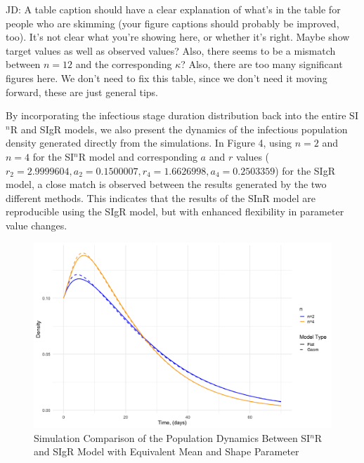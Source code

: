 \documentclass[12pt]{article}
\begin{document}
JD: A table caption should have a clear explanation of what's in the table for people who are skimming (your figure captions should probably be improved, too). It's not clear what you're showing here, or whether it's right. Maybe show target values as well as observed values? Also, there seems to be a mismatch between $n=12$ and the corresponding $\kappa$? Also, there are too many significant figures here. We don't need to fix this table, since we don't need it moving forward, these are just general tips.

By incorporating the infectious stage duration distribution back into the entire SI$^n$R and SIgR models, we also present the dynamics of the infectious population density generated directly from the simulations. In Figure 4, using $n=2$ and $n=4$ for the SI$^n$R model and corresponding $a$ and $r$ values ( $r_2=2.9999604, a_2=0.1500007, r_4 = 1.6626998, a_4 = 0.2503359$) for the SIgR model, a close match is observed between the results generated by the two different methods. This indicates that the results of the SInR model are reproducible using the SIgR model, but with enhanced flexibility in parameter value changes.
\begin{figure}[h]
    \centering
    \includegraphics[width= \textwidth]{4.3.2.png}
    \caption{Simulation Comparison of the Population Dynamics Between SI$^n$R and SIgR Model with Equivalent Mean and Shape Parameter}
\end{figure}
\end{document}
